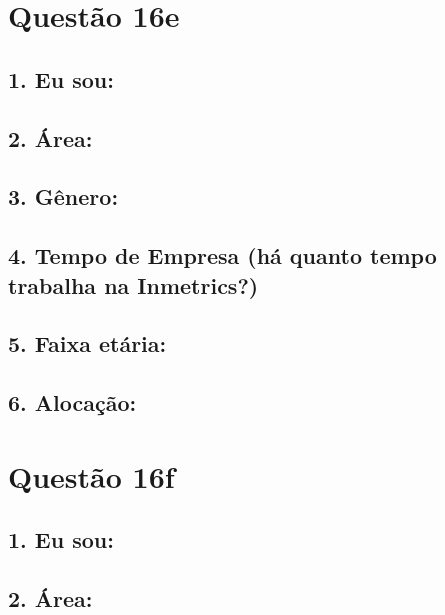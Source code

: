 \documentclass[]{book}
\begin{document}
\hypertarget{questao-16e}{%
\section{Questão 16e}\label{questao-16e}}

\hypertarget{eu-sou-33}{%
\subsection{1. Eu sou:}\label{eu-sou-33}}

\hypertarget{area-33}{%
\subsection{2. Área:}\label{area-33}}

\hypertarget{genero-33}{%
\subsection{3. Gênero:}\label{genero-33}}

\hypertarget{tempo-de-empresa-ha-quanto-tempo-trabalha-na-inmetrics-33}{%
\subsection{4. Tempo de Empresa (há quanto tempo trabalha na Inmetrics?)}\label{tempo-de-empresa-ha-quanto-tempo-trabalha-na-inmetrics-33}}

\hypertarget{faixa-etaria-33}{%
\subsection{5. Faixa etária:}\label{faixa-etaria-33}}

\hypertarget{alocacao-33}{%
\subsection{6. Alocação:}\label{alocacao-33}}

\hypertarget{questao-16f}{%
\section{Questão 16f}\label{questao-16f}}

\hypertarget{eu-sou-34}{%
\subsection{1. Eu sou:}\label{eu-sou-34}}

\hypertarget{area-34}{%
\subsection{2. Área:}\label{area-34}}
\end{document}

